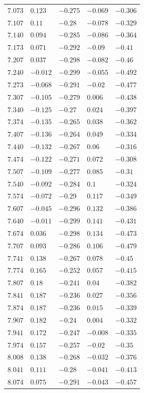 \begin{table}[h]
\begin{tabular}{rllll}
$7.073$&$0.123$&$-0.275$&$-0.069$&$-0.306$\\
$7.107$&$0.11$&$-0.28$&$-0.078$&$-0.329$\\
$7.140$&$0.094$&$-0.285$&$-0.086$&$-0.364$\\
$7.173$&$0.071$&$-0.292$&$-0.09$&$-0.41$\\
$7.207$&$0.037$&$-0.298$&$-0.082$&$-0.46$\\
$7.240$&$-0.012$&$-0.299$&$-0.055$&$-0.492$\\
$7.273$&$-0.068$&$-0.291$&$-0.02$&$-0.477$\\
$7.307$&$-0.105$&$-0.279$&$0.006$&$-0.438$\\
$7.340$&$-0.125$&$-0.27$&$0.024$&$-0.397$\\
$7.374$&$-0.135$&$-0.265$&$0.038$&$-0.362$\\
$7.407$&$-0.136$&$-0.264$&$0.049$&$-0.334$\\
$7.440$&$-0.132$&$-0.267$&$0.06$&$-0.316$\\
$7.474$&$-0.122$&$-0.271$&$0.072$&$-0.308$\\
$7.507$&$-0.109$&$-0.277$&$0.085$&$-0.31$\\
$7.540$&$-0.092$&$-0.284$&$0.1$&$-0.324$\\
$7.574$&$-0.072$&$-0.29$&$0.117$&$-0.349$\\
$7.607$&$-0.045$&$-0.296$&$0.132$&$-0.386$\\
$7.640$&$-0.011$&$-0.299$&$0.141$&$-0.431$\\
$7.674$&$0.036$&$-0.298$&$0.134$&$-0.473$\\
$7.707$&$0.093$&$-0.286$&$0.106$&$-0.479$\\
$7.741$&$0.138$&$-0.267$&$0.078$&$-0.45$\\
$7.774$&$0.165$&$-0.252$&$0.057$&$-0.415$\\
$7.807$&$0.18$&$-0.241$&$0.04$&$-0.382$\\
$7.841$&$0.187$&$-0.236$&$0.027$&$-0.356$\\
$7.874$&$0.187$&$-0.236$&$0.015$&$-0.339$\\
$7.907$&$0.182$&$-0.24$&$0.004$&$-0.332$\\
$7.941$&$0.172$&$-0.247$&$-0.008$&$-0.335$\\
$7.974$&$0.157$&$-0.257$&$-0.02$&$-0.35$\\
$8.008$&$0.138$&$-0.268$&$-0.032$&$-0.376$\\
$8.041$&$0.111$&$-0.28$&$-0.041$&$-0.413$\\
$8.074$&$0.075$&$-0.291$&$-0.043$&$-0.457$\\

\end{tabular}
\end{table}
